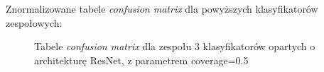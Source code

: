 \documentclass[polish,12pt]{aghthesis}
\begin{document}
\noindent Znormalizowane tabele \textit{confusion matrix} dla powyższych klasyfikatorów zespołowych:
\begin{figure}[H]%
    \begin{adjustbox}{minipage=1.0\paperwidth, pagecenter}
    \centering
    \qquad
    \end{adjustbox}
    \label{fig:resnet-ens-3-0.5-matrices}
    \caption{Tabele \textit{confusion matrix} dla zespołu 3 klasyfikatorów opartych o architekturę ResNet, z parametrem coverage=0.5}
\end{figure}
\end{document}
